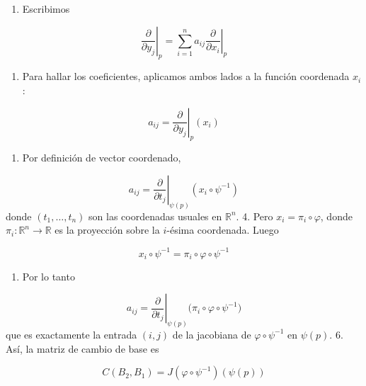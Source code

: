 \begin{bookproof}{}
\begin{enumerate}
\item Escribimos
\end{enumerate}
\[
\left.\frac{\partial}{\partial y_j}\right|_p=\sum_{i=1}^n a_{ij}\left.\frac{\partial}{\partial x_i}\right|_p
\]
\begin{enumerate}[start=2]
\item Para hallar los coeficientes, aplicamos ambos lados a la función coordenada $x_i$:
\end{enumerate}
\[
a_{ij}=\left.\frac{\partial}{\partial y_j}\right|_p(x_i)
\]
\begin{enumerate}[start=3]
\item Por definición de vector coordenado,
\end{enumerate}
\[
a_{ij}=\left.\frac{\partial}{\partial t_j}\right|_{\psi(p)}(x_i\circ\psi^{-1})
\]
donde $(t_1,\dots,t_n)$ son las coordenadas usuales en $\mathbb{R}^n$. 4. Pero $x_i=\pi_i\circ\varphi$, donde $\pi_i:\mathbb{R}^n\to\mathbb{R}$ es la proyección sobre la $i$-ésima coordenada. Luego

\[
x_i\circ\psi^{-1}=\pi_i\circ\varphi\circ\psi^{-1}
\]
\begin{enumerate}[start=5]
\item Por lo tanto
\end{enumerate}
\[
a_{ij}=\left.\frac{\partial}{\partial t_j}\right|_{\psi(p)}\bigl(\pi_i\circ\varphi\circ\psi^{-1}\bigr)
\]
que es exactamente la entrada $(i,j)$ de la jacobiana de $\varphi\circ\psi^{-1}$ en $\psi(p)$. 6. Así, la matriz de cambio de base es

\[
C(B_{2},B_{1})=J(\varphi\circ\psi^{-1})(\psi(p))
\]
\bookqed
\end{bookproof}
